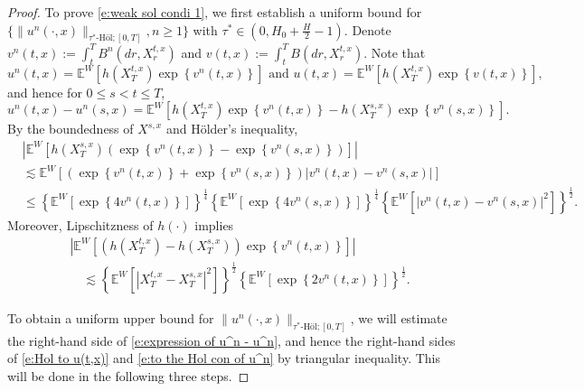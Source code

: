 \documentclass[11pt,reqno]{amsart}
\def\E{\mathbb E}
\numberwithin{equation}{section}
\begin{document}
\begin{proof}
To prove \eqref{e:weak sol condi 1}, we first establish a uniform bound for $\big\{\|u^{n}(\cdot,x)\|_{\tau^*\text{-H\"ol};[0,T]}, n\ge 1\big\}$ with
$\tau^*\in\left( 0,H_0 + \frac{H}{2} - 1 \right).$
Denote $v^{n}(t,x) := \int_{t}^{T}B^{n}(dr,X^{t,x}_{r})$ and $v(t,x) := \int_{t}^{T}B(dr,X^{t,x}_{r})$. Note that 
\begin{equation*}
u^{n}(t,x) = \E^{W}\left[h(X^{t,x}_{T})\exp\left\{v^{n}(t,x)\right\}\right] \text{ and } u(t,x) = \E^{W}\left[h(X^{t,x}_{T})\exp\left\{v(t,x)\right\}\right],
\end{equation*}
and hence for $0\le s< t\le T$,
\begin{equation}\label{e:expression of u^n - u^n}
u^{n}(t,x) - u^n(s,x) = \mathbb{E}^{W}\left[h(X^{t,x}_{T})\exp\left\{v^{n}(t,x)\right\} - h(X^{s,x}_{T})\exp\left\{v^n(s,x)\right\}\right].
\end{equation}
By the boundedness of $X^{s,x}$ and H\"older's inequality, 
\begin{equation}\label{e:Hol to u(t,x)}
\begin{aligned}
&\left|\mathbb{E}^{W}\left[h(X^{s,x}_{T})\left(\exp\left\{v^{n}(t,x)\right\} - \exp\left\{v^n(s,x)\right\}\right)\right]\right|\\
& \lesssim \mathbb{E}^{W}\left[\left(\exp\left\{v^{n}(t,x)\right\} + \exp\left\{v^{n}(s,x)\right\}\right)\left|v^{n}(t,x) - v^{n}(s,x)\right|\right]\\
& \le \left\{\mathbb{E}^{W}\left[\exp\left\{4v^{n}(t,x)\right\}\right]\right\}^{\frac{1}{4}} \left\{\mathbb{E}^{W}\left[\exp\left\{4v^{n}(s,x)\right\}\right]\right\}^{\frac{1}{4}} \left\{\mathbb{E}^{W}\left[\left|v^{n}(t,x) - v^{n}(s,x)\right|^{2}\right]\right\}^{\frac{1}{2}}.
\end{aligned}
\end{equation}
Moreover,  Lipschitzness of $h(\cdot)$ implies
\begin{equation}\label{e:to the Hol con of u^n}
\begin{aligned}
&\left|\E^{W}\left[\left(h(X^{t,x}_{T}) - h(X^{s,x}_{T})\right)\exp\left\{v^{n}(t,x)\right\}\right]\right|\\
&\quad \lesssim \left\{\E^{W}\left[|X^{t,x}_{T} - X^{s,x}_{T}|^2\right]\right\}^{\frac{1}{2}}\left\{\mathbb{E}^{W}\left[\exp\left\{2v^{n}(t,x)\right\}\right]\right\}^{\frac{1}{2}}.
\end{aligned}
\end{equation}



To obtain a uniform upper bound for   $\|u^n(\cdot,x)\|_{\tau^*\text{-H\"ol};[0,T]}$, 
we will estimate the right-hand side of \eqref{e:expression of u^n - u^n}, and hence the right-hand sides of \eqref{e:Hol to u(t,x)} and \eqref{e:to the Hol con of u^n} by triangular inequality. This  will be done in the following  three steps.


\end{proof}
\end{document}
